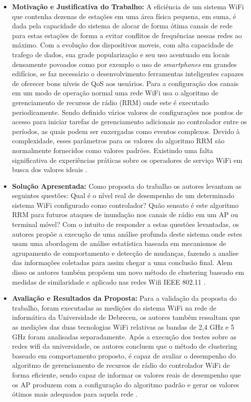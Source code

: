 \documentclass[tid,table]{texufpel} %
\begin{document}
\begin{itemize}
	\item \textbf{Motivação e Justificativa do Trabalho:} A eficiência de um sistema WiFi que contenha dezenas de estações em uma área física pequena, em suma, é dada pela capacidade do sistema de alocar de forma ótima canais de rede para estas estações de forma a evitar conflitos de frequências nessas redes ao máximo. Com a evolução dos dispositivos moveis, com alta capacidade de trafego de dados, sua grade popularização e seu uso acentuado em locais densamente povoados como por exemplo o uso de \textit{smartphones} em grandes edifícios, se faz necessário o desenvolvimento ferramentas inteligentes capazes de oferecer bons níveis de QoS aos usuários. Para a configuração dos canais em um modo de operação normal uma rede WiFi usa o algoritmo de gerenciamento de recursos de rádio (RRM) onde este é executado periodicamente. Sendo definido vários valores de configurações nos pontos de acesso para iniciar tarefas de gerenciamento adicionais no controlador entre os períodos, as quais podem ser enxergadas como eventos complexos. Devido à complexidade, esses parâmetros para os valores do algoritmo RRM são normalmente fornecidos como valores padrões. Existindo uma falta significativa de experiências práticas sobre os operadores de serviço WiFi em busca dos valores ideais \cite{art7gal2017anaysis}.
	
	
	
	\item \textbf{Solução Apresentada:} Como proposta do trabalho os autores levantam as seguintes questões: Qual é o nível real de desempenho de um determinado sistema WiFi configurado como controlador? Quão sensato é este algoritmo RRM para futuros ataques de inundação nos canais de rádio em um AP ou terminal móvel? Com o intuito de responder a estas questões levantadas, os autores propõe a execução de uma análise profunda deste sistema onde estes usam uma  abordagem de análise estatística baseada em mecanismos de agrupamento de comportamento e detecção de mudanças, fazendo a analise das informações coletadas para assim chegar a uma conclusão final. Alem disso os autores também propõem um novo método de clustering baseado em medidas de similaridade e aplicado nas redes Wifi IEEE 802.11 \cite{art7gal2017anaysis}.
		
	
	\item \textbf{Avaliação e Resultados da Proposta:} Para a validação da proposta do trabalho, foram executadas as medições do sistema WiFi na rede de informática da Universidade de Debrecen, os autores também ressaltam que as medições das duas tecnologias WiFi relativas as bandas de 2,4 GHz e 5 GHz foram analisadas separadamente. Após a execução dos testes sobre as redes wifi da universidade, os autores concluem que o método de clustering baseado em comportamento proposto, é capaz de avaliar o desempenho do algoritmo de gerenciamento de recursos de rádio do controlador WiFi de forma eficiente, sendo capaz de informar os valores reais de desempenho que os AP produzem com a configuração do algoritmo padrão e gerar os valores ótimos mais adequados para aquela rede \cite{art7gal2017anaysis}.
	
	
\end{itemize}
\end{document}
